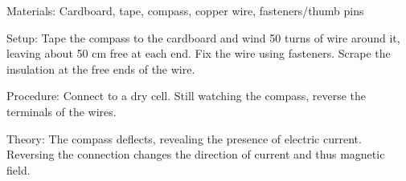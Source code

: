 \begin{multicols}{2}
\begin{description*}
\item[Materials:]{Cardboard, tape, compass, copper wire, fasteners/thumb pins}
\item[Setup:]{Tape the compass to the cardboard and wind 50 turns of wire around it, leaving about 50 cm free at each end. Fix the wire using fasteners. Scrape the insulation at the free ends of the wire.}
\item[Procedure:]{Connect to a dry cell. Still watching the compass, reverse the terminals of the wires.}
\item[Theory:]{The compass deflects, revealing the presence of electric current. Reversing the connection changes the direction of current and thus magnetic field.}
\end{description*}


\end{multicols}
